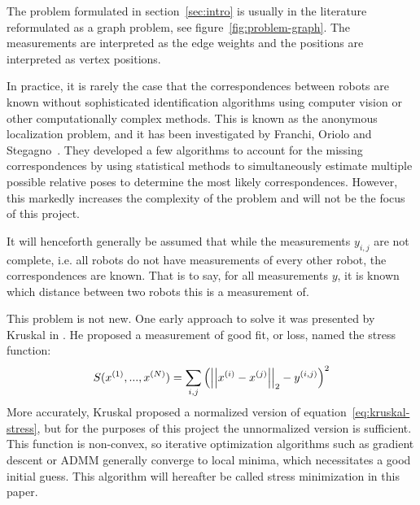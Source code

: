 The problem formulated in section~\ref{sec:intro} is usually in the literature reformulated as a graph problem, see figure~\ref{fig:problem-graph}. The measurements are interpreted as the edge weights and the positions are interpreted as vertex positions. 

In practice, it is rarely the case that the correspondences between robots are known without sophisticated identification algorithms using computer vision or other computationally complex methods. This is known as the anonymous localization problem, and it has been investigated by Franchi, Oriolo and Stegagno~\cite{anonymous_loc_1,anonymous_loc_2,anonymous_loc_3}. They developed a few algorithms to account for the missing correspondences by using statistical methods to simultaneously estimate multiple possible relative poses to determine the most likely correspondences. However, this markedly increases the complexity of the problem and will not be the focus of this project.

It will henceforth generally be assumed that while the measurements $y_{i,j}$ are not complete, i.e. all robots do not have measurements of every other robot, the correspondences are known. That is to say, for all measurements $y$, it is known which distance between two robots this is a measurement of. 

This problem is not new. One early approach to solve it was presented by Kruskal in \cite{Kruskal1964}. He proposed a measurement of good fit, or loss, named the stress function: 
\begin{align}
    \label{eq:kruskal-stress}
    S(x^{(1)}, ..., x^{(N)}) = \sum_{i,j} \left(
        \norm{x^{(i)} - x^{(j)}}_2 - y^{(i, j)}
    \right)^2
\end{align}
More accurately, Kruskal proposed a normalized version of equation~\ref{eq:kruskal-stress}, but for the purposes of this project the unnormalized version is sufficient. This function is non-convex, so iterative optimization algorithms such as gradient descent or ADMM generally converge to local minima, which necessitates a good initial guess. This algorithm will hereafter be called stress minimization in this paper.

